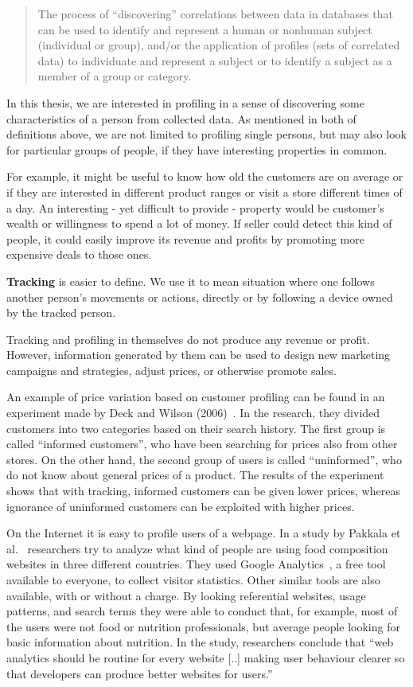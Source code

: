 \documentclass[12pt,a4paper,oneside,pdftex]{report}
\begin{document}
\begin{quote}
The process of ``discovering'' correlations between data in databases that can be used to identify and represent a human or nonhuman subject (individual or group), and/or the application of profiles (sets of correlated data) to individuate and represent a subject or to identify a subject as a member of a group or category.
\end{quote}

In this thesis, we are interested in profiling in a sense of discovering some characteristics of a person from collected data. As mentioned in both of definitions above, we are not limited to profiling single persons, but may also look for particular groups of people, if they have interesting properties in common.

For example, it might be useful to know how old the customers are on average or if they are interested in different product ranges or visit a store different times of a day. An interesting - yet difficult to provide - property would be customer's wealth or willingness to spend a lot of money. If seller could detect this kind of people, it could easily improve its revenue and profits by promoting more expensive deals to those ones.

\textbf{Tracking} is easier to define. We use it to mean situation where one follows another person's movements or actions, directly or by following a device owned by the tracked person. 

Tracking and profiling in themselves do not produce any revenue or profit. However, information generated by them can be used to design new marketing campaigns and strategies, adjust prices, or otherwise promote sales.

An example of price variation based on customer profiling can be found in an experiment made by Deck and Wilson (2006)~\cite{Deck2006}. In the research, they divided customers into two categories based on their search history. The first group is called ``informed customers'', who have been searching for prices also from other stores. On the other hand, the second group of users is called ``uninformed'', who do not know about general prices of a product. The results of the experiment shows that with tracking, informed customers can be given lower prices, whereas ignorance of uninformed customers can be exploited with higher prices.

On the Internet it is easy to profile users of a webpage. In a study by Pakkala et al.~\cite{Pakkala2012504} researchers try to analyze what kind of people are using food composition websites in three different countries. They used Google Analytics~\cite{googleanalytics}, a free tool available to everyone, to collect visitor statistics. Other similar tools are also available, with or without a charge. By looking referential websites, usage patterns, and search terms they were able to conduct that, for example, most of the users were not food or nutrition professionals, but average people looking for basic information about nutrition. In the study, researchers conclude that ``web analytics should be routine for every website [..] making user behaviour clearer so that developers can produce better websites for users.''
\end{document}

